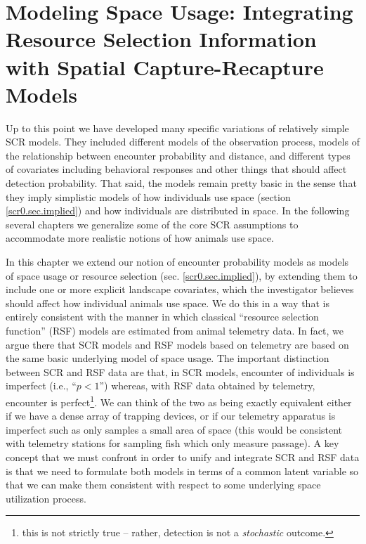 \chapter{
Modeling Space Usage:
Integrating Resource Selection Information with
Spatial Capture-Recapture
  Models}

\label{chapt.rsf}


\vspace{.3in}

Up to this point we have developed many specific variations of
relatively simple SCR models. They included different models of the
observation process, models of the relationship between encounter
probability and distance, and different types of covariates including
behavioral responses and other things that should affect detection
probability.  That said, the models remain pretty basic in the sense
that they imply simplistic models of how individuals use space
(section \ref{scr0.sec.implied}) and how individuals are distributed
in space.  In the following several chapters we generalize some of the
core SCR assumptions to accommodate more realistic notions of how
animals use space.

In this chapter we extend our notion of encounter probability models
as models of space usage or resource selection
(sec. \ref{scr0.sec.implied}), by extending them to include one or
more explicit landscape covariates, which the investigator believes
should affect how individual animals use space. We do this in a way
that is entirely consistent with the manner in which classical
``resource selection function'' (RSF) models are estimated from animal
telemetry data.  In fact, we argue there that SCR models and RSF
models based on telemetry are based on the same basic underlying model
of space usage. The important distinction between SCR and RSF data are
that, in SCR models, encounter of individuals is imperfect (i.e.,
``$p<1$'') whereas, with RSF data obtained by telemetry, encounter is
perfect\footnote{this is not strictly true -- rather, detection is not
  a {\it stochastic} outcome.}. We can think of the two as being
exactly equivalent either if we have a dense array of trapping
devices, or if our telemetry apparatus is imperfect such as only
samples a small area of space (this would be consistent with telemetry
stations for sampling fish which only measure passage).  A key concept
that we must confront in order to unify and integrate SCR and RSF data
is that we need to formulate both models in terms of a common latent
variable so that we can make them consistent with respect to some
underlying space utilization process.

